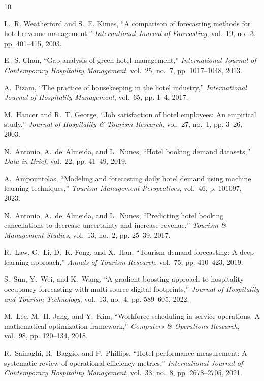 \documentclass[11pt,a4paper]{article}
\begin{document}

\begin{thebibliography}{10}

L.~R. Weatherford and S.~E. Kimes, ``A comparison of forecasting methods for hotel revenue management,'' \emph{International Journal of Forecasting}, vol.~19, no.~3, pp. 401--415, 2003.

E.~S. Chan, ``Gap analysis of green hotel management,'' \emph{International Journal of Contemporary Hospitality Management}, vol.~25, no.~7, pp. 1017--1048, 2013.

A.~Pizam, ``The practice of housekeeping in the hotel industry,'' \emph{International Journal of Hospitality Management}, vol.~65, pp. 1--4, 2017.

M.~Hancer and R.~T. George, ``Job satisfaction of hotel employees: An empirical study,'' \emph{Journal of Hospitality \& Tourism Research}, vol.~27, no.~1, pp. 3--26, 2003.

N.~Antonio, A.~de~Almeida, and L.~Nunes, ``Hotel booking demand datasets,'' \emph{Data in Brief}, vol.~22, pp. 41--49, 2019.

A.~Ampountolas, ``Modeling and forecasting daily hotel demand using machine learning techniques,'' \emph{Tourism Management Perspectives}, vol.~46, p. 101097, 2023.

N.~Antonio, A.~de~Almeida, and L.~Nunes, ``Predicting hotel booking cancellations to decrease uncertainty and increase revenue,'' \emph{Tourism \& Management Studies}, vol.~13, no.~2, pp. 25--39, 2017.

R.~Law, G.~Li, D.~K. Fong, and X.~Han, ``Tourism demand forecasting: A deep learning approach,'' \emph{Annals of Tourism Research}, vol.~75, pp. 410--423, 2019.

S.~Sun, Y.~Wei, and K.~Wang, ``A gradient boosting approach to hospitality occupancy forecasting with multi-source digital footprints,'' \emph{Journal of Hospitality and Tourism Technology}, vol.~13, no.~4, pp. 589--605, 2022.

M.~Lee, M.~H. Jang, and Y.~Kim, ``Workforce scheduling in service operations: A mathematical optimization framework,'' \emph{Computers \& Operations Research}, vol.~98, pp. 120--134, 2018.

R.~Sainaghi, R.~Baggio, and P.~Phillips, ``Hotel performance measurement: A systematic review of operational efficiency metrics,'' \emph{International Journal of Contemporary Hospitality Management}, vol.~33, no.~8, pp. 2678--2705, 2021.


\end{thebibliography}
\end{document}

